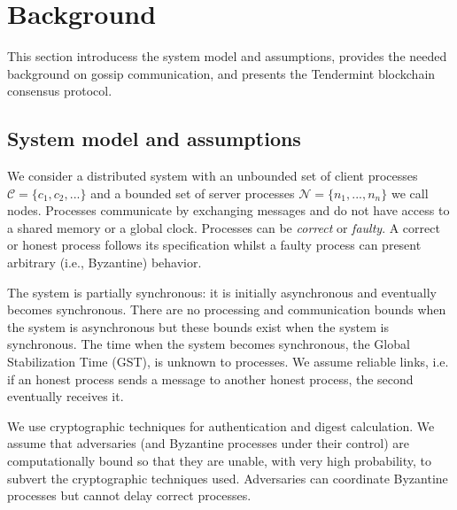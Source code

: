 
\section{Background}
\label{sec:background}

This section introducess the system model and assumptions, provides the needed background 
on gossip communication, and presents the Tendermint blockchain consensus protocol.

\subsection{System model and assumptions}
\label{sec:model}

We consider a distributed system with an unbounded set of client processes $\mathcal{C} = \{ c_1, c_2, ... \}$ and a bounded set of server processes $\mathcal{N} = \{ n_1, ..., n_n \}$ we call nodes.
Processes communicate by exchanging messages and do not have access to a shared memory or a global clock. 
Processes can be \emph{correct} or \emph{faulty}. 
A correct or honest process follows its specification whilst a faulty process can present arbitrary (i.e., Byzantine) behavior. 

The system is partially synchronous: it is initially asynchronous and eventually becomes synchronous. 
There are no processing and communication bounds when the system is asynchronous but these bounds exist when the system is synchronous.
The time when the system becomes synchronous, the Global Stabilization Time (GST), is unknown to processes.   
We assume reliable links,  i.e. if an honest process sends a message to another honest process, the second eventually receives it.

We use cryptographic techniques for authentication and digest calculation. 
We assume that adversaries (and Byzantine processes under their control) are computationally bound so that they are unable, with very high probability, to subvert the cryptographic techniques used. 
Adversaries can coordinate Byzantine processes but cannot delay correct processes.



\newcommand{\node}{{node}}
\newcommand{\nodes}{{nodes}}

